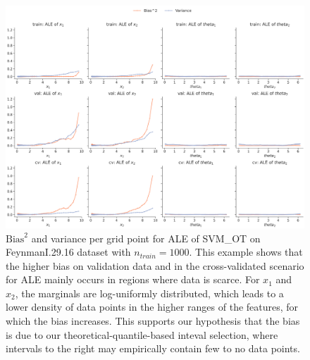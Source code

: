 \documentclass[runningheads]{llncs}
\begin{document}
\begin{figure}
    \centering
    \includegraphics[width=\textwidth]{img/further_investigation/feynman_ale_SVM_OT_1000.png}
    \caption{$\text{Bias}^2$ and variance per grid point for ALE of SVM\_OT on FeynmanI.29.16 dataset with $n_{train} = 1000$.
    This example shows that the higher bias on validation data and in the cross-validated scenario for ALE mainly occurs in regions
    where data is scarce. For $x_1$ and $x_2$, the marginals are log-uniformly distributed, which leads to a lower density of data points
    in the higher ranges of the features, for which the bias increases. This supports our hypothesis that the bias is due to our
    theoretical-quantile-based inteval selection, where intervals to the right may empirically contain few to no data points.}
    \label{fig:further-ale-svm-feynman}  %
\end{figure}
\end{document}
